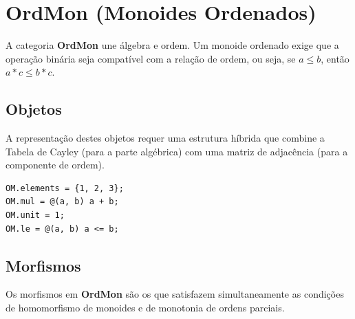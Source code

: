 \section{OrdMon (Monoides Ordenados)}

A categoria \textbf{OrdMon} une álgebra e ordem. Um monoide ordenado exige que a operação binária seja compatível com a relação de ordem, ou seja, se $a \le b$, então $a*c \le b*c$.

\subsection{Objetos}
A representação destes objetos requer uma estrutura híbrida que combine a Tabela de Cayley (para a parte algébrica) com uma matriz de adjacência (para a componente de ordem).

\begin{lstlisting}[caption={Modelação Híbrida de OrdMon}]
OM.elements = {1, 2, 3};
OM.mul = @(a, b) a + b; 
OM.unit = 1;            
OM.le = @(a, b) a <= b; 
\end{lstlisting}

\subsection{Morfismos}
Os morfismos em \textbf{OrdMon} são os que satisfazem simultaneamente as condições de homomorfismo de monoides e de monotonia de ordens parciais.